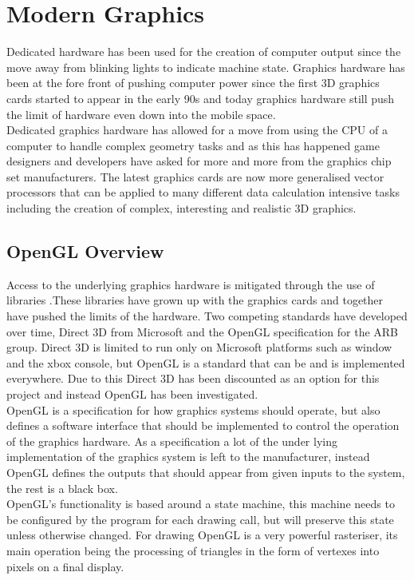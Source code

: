 \section{Modern Graphics}
Dedicated hardware has been used for the creation of computer output since the
move away from blinking lights to indicate machine state. Graphics hardware has
been at the fore front of pushing computer power since the first 3D graphics 
cards started to appear in the early 90s and today graphics hardware still push
the limit of hardware even down into the mobile space.\\

Dedicated graphics hardware has allowed for a move from using the CPU of a 
computer to handle complex geometry tasks and as this has happened game designers
and developers have asked for more and more from the graphics chip set
manufacturers. The latest graphics cards are now more generalised vector 
processors that can be applied to many different data calculation intensive tasks
including the creation of complex, interesting and realistic 3D graphics.\\

\subsection{OpenGL Overview} 
Access to the underlying graphics hardware is mitigated through the use of libraries
.These 
libraries have grown up with the graphics cards and together have pushed the 
limits of the hardware. Two competing standards have developed over time, Direct
3D from Microsoft and the OpenGL specification for the ARB group. Direct 3D is 
limited to run only on Microsoft platforms such as window and the xbox console,
but OpenGL is a standard that can be and is implemented everywhere. Due to this
Direct 3D has been discounted as an option for this project and instead OpenGL
has been investigated.\\

OpenGL is a specification for how graphics systems should operate, but also 
defines a software interface that should be implemented to control the operation
of the graphics hardware. As a specification a lot of the under lying 
implementation of the graphics system is left to the manufacturer, instead 
OpenGL defines the outputs that should appear from given inputs to the system,
the rest is a black box.\\

OpenGL's functionality is based around a state machine, this machine needs to be
configured by the program for each drawing call, but will preserve this state 
unless otherwise changed. For drawing OpenGL is a very powerful rasteriser, its
main operation being the processing of triangles in the form of vertexes into
pixels on a final display. \\

